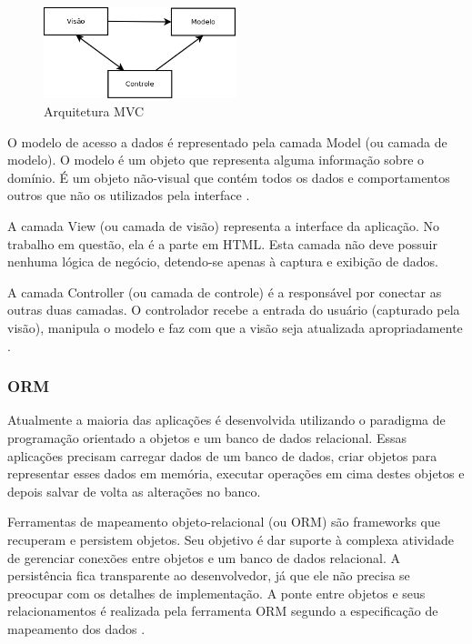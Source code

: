 \begin{figure}[htbp]
\centering
\includegraphics[width=0.5\textwidth]{fig/diagrama_mvc.png}
\caption{Arquitetura MVC}
\label{fig:diag_mvc}
\end{figure}

O modelo de acesso a dados é representado pela camada Model (ou camada de modelo). O modelo 
é um objeto que representa alguma informação sobre o domínio. É um objeto não-visual 
que contém todos os dados e comportamentos outros que não os utilizados 
pela interface \cite{Fowler:2006}.

A camada View (ou camada de visão) representa a interface da aplicação. No trabalho
em questão, ela é a parte em HTML. Esta camada não deve possuir nenhuma lógica de negócio,
detendo-se apenas à captura e exibição de dados.

A camada Controller (ou camada de controle) é a responsável por conectar as outras duas
camadas. O controlador recebe a entrada do usuário (capturado pela visão), manipula o 
modelo e faz com que a visão seja atualizada apropriadamente \cite{Fowler:2006}.




\subsubsection{ORM}
Atualmente a maioria das aplicações é desenvolvida utilizando o paradigma de programação 
orientado a objetos e um banco de dados relacional. Essas aplicações precisam carregar
dados de um banco de dados, criar objetos para representar esses dados em memória,
executar operações em cima destes objetos e depois salvar de volta as alterações no banco.

Ferramentas de mapeamento objeto-relacional (ou ORM) são frameworks que recuperam e persistem
objetos. Seu objetivo é dar suporte à complexa atividade de gerenciar conexões entre
objetos e um banco de dados relacional. A persistência fica transparente ao desenvolvedor,
já que ele não precisa se preocupar com os detalhes de implementação. A ponte entre
objetos e seus relacionamentos é realizada pela ferramenta ORM segundo a especificação 
de mapeamento dos dados \cite{springerlink}.

